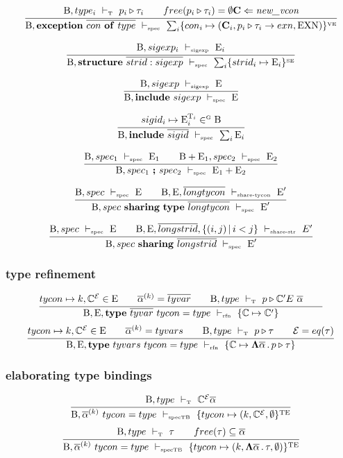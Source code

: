 \documentclass[11pt,a4paper]{article}
\newcommand{\key}[1]{\textrm{\textbf{#1}}}
\newcommand{\type}      {\key{type}}
\newcommand{\exception} {\key{exception}}
\newcommand{\of}        {\key{of}}
\newcommand{\inc}       {\key{include}}
\newcommand{\sharing}   {\key{sharing}}
\newcommand{\Structure} {\key{structure}}
\newcommand{\B}  {\textrm{B}}
\newcommand{\E}  {\textrm{E}}
\newcommand{\T}  {\textrm{T}}
\newcommand{\TE} {\textrm{TE}}
\newcommand{\sVE}{\textrm{\tiny VE}}
\newcommand{\sSE}{\textrm{\tiny SE}}
\newcommand{\sG} {\textrm{\tiny G}}
\newcommand{\tycon}{\mathbb{C}}
\newcommand{\vcon} {\mathbf{C}}
\newcommand{\equality}{\mathcal{E}}
\newcommand{\VKE}  {\textrm{EXN}}
\newcommand{\corenew}[1]{\textit{new\_#1}}
\newcommand{\vdashSigexp}  {\ \vdash_{\textrm{\tiny sigexp}}\ }
\newcommand{\vdashSpec}    {\ \vdash_{\textrm{\tiny spec}}\ }
\newcommand{\vdashSpecTB}  {\ \vdash_{\textrm{\tiny specTB}}\ }
\newcommand{\vdashTyperfn} {\ \vdash_{\textrm{\tiny rfn}}\ }
\newcommand{\vdashShareTycon}{\ \vdash_{\textrm{\tiny share-tycon}}\ }
\newcommand{\vdashShareStr}	{\ \vdash_{\textrm{\tiny share-str}}\ }
\newcommand{\vdashT}       {\ \vdash_{\textrm{\tiny T}}\ }
\newcommand{\braced}[1]{\{#1\}}
\newcommand{\qualtype}[2]{#1 \triangleright #2}
\newcommand{\tyfun}[2]{\mathbf{\Lambda} #1\,.\,#2}
\begin{document}
\[
\cfrac
 {\B, type_i \vdashT \qualtype{p_i}{\tau_i} \qquad
  free(\qualtype{p_i}{\tau_i}) = \emptyset
  \vcon\Leftarrow\corenew{vcon}}
 {\B, \exception\ \overline{con\ \of\ type} \vdashSpec
    \sum_i \braced{con_i \mapsto (\vcon_i, \qualtype{p_i}{\tau_i\to exn}, \VKE)}^\sVE}
\]

\[
\cfrac
 {\B, sigexp_i \vdashSigexp \E_i}
 {\B, \Structure\ \overline{strid:sigexp} \vdashSpec
   \sum_i \braced{strid_i \mapsto \E_i}^\sSE }
\]

\[
\cfrac
 {\B, sigexp \vdashSigexp \E}
 {\B, \inc\ sigexp \vdashSpec \E}
\]

\[
\cfrac
 {sigid_i \mapsto \E_i^{\T_i} \in^\sG \B}
 {\B, \inc\ \overline{sigid} \vdashSpec \sum_i \E_i}
\]

\[
\cfrac
 {\B,      spec_1 \vdashSpec \E_1 \qquad
  \B+\E_1, spec_2 \vdashSpec \E_2}
 {\B, spec_1\ \key{;}\ spec_2 \vdashSpec \E_1 + \E_2}
\]

\[
\cfrac
 { \B, spec \vdashSpec \E \qquad
   \B, \E, \overline{longtycon} \vdashShareTycon \E' }
 {\B, spec\ \sharing\ \type\ \overline{longtycon} \vdashSpec \E'}
\]

\[
\cfrac
 {\B, spec \vdashSpec \E \qquad
  \B, \E, \overline{longstrid},\braced{(i,j)\,|\,i<j}\vdashShareStr E'}
 {\B, spec\ \sharing\ \overline{longstrid} \vdashSpec \E'}
\]

\subsubsection {type refinement}
\[
\cfrac
 {tycon \mapsto k, \tycon^\equality \in \E                  \qquad
  \overline{\alpha}^{(k)} = \overline{tyvar}                \qquad
  \B, type \vdashT \qualtype{p}{\tycon'^\equality\ \overline{\alpha}} \qquad
  }
 {\B, \E, \type\ \overline{tyvar}\ tycon = type \vdashTyperfn \braced{\tycon \mapsto \tycon'}}
\]
\[
\cfrac
 {tycon \mapsto k, \tycon^\equality \in \E                  \qquad
  \overline{\alpha}^{(k)} = tyvars                          \qquad
  \B, type \vdashT \qualtype{p}{\tau}                       \qquad
  \equality = eq(\tau)
  }
 {\B, \E, \type\ tyvars\ tycon = type \vdashTyperfn
    \braced{\tycon \mapsto \tyfun{\overline{\alpha}}{\qualtype{p}{\tau}}}}
\]

\subsubsection {elaborating type bindings}
\[
\cfrac
 {\B, type \vdashT \tycon^\equality \overline\alpha }
 {\B,\overline{\alpha}^{(k)}\ tycon = type \vdashSpecTB \braced{tycon \mapsto (k, \tycon^\equality,\emptyset}^\TE}
\]
\[
\cfrac
 {\B, type \vdashT \tau \qquad free(\tau) \subseteq \overline\alpha}
 {\B,\overline{\alpha}^{(k)}\ tycon = type \vdashSpecTB 
     \braced{tycon \mapsto (k, \tyfun{\overline\alpha}{\tau},\emptyset)}^\TE}
\]
\end{document}
